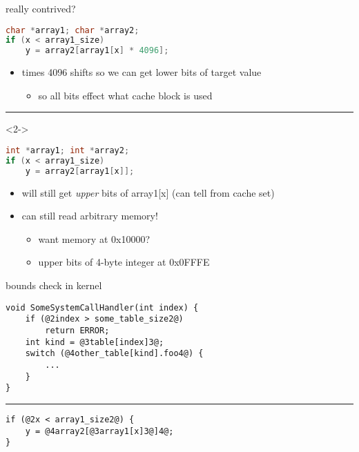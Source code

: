 \begin{frame}[fragile]{really contrived?}
\begin{lstlisting}[language=C,style=smaller]
char *array1; char *array2;
if (x < array1_size)
    y = array2[array1[x] * 4096];
\end{lstlisting}
\begin{itemize}
\item times 4096 shifts so we can get lower bits of target value
    \begin{itemize}
    \item so all bits effect what cache block is used
    \end{itemize}
\end{itemize}
\hrule
\begin{visibleenv}<2->
\begin{lstlisting}[language=C,style=smaller]
int *array1; int *array2;
if (x < array1_size)
    y = array2[array1[x]];
\end{lstlisting}
\begin{itemize}
\item will still get \textit{upper} bits of array1[x] (can tell from cache set)
\item<2-> can still read arbitrary memory!
    \begin{itemize}
    \item want memory at 0x10000?
    \item upper bits of 4-byte integer at 0x0FFFE
    \end{itemize}
\end{itemize}
\end{visibleenv}
\end{frame}

\begin{frame}[fragile]{bounds check in kernel}
\begin{lstlisting}
void SomeSystemCallHandler(int index) {
    if (@2index > some_table_size2@) 
        return ERROR;
    int kind = @3table[index]3@;
    switch (@4other_table[kind].foo4@) {
        ...
    }
}
\end{lstlisting}
\hrule
\begin{lstlisting}
if (@2x < array1_size2@) {
    y = @4array2[@3array1[x]3@]4@;
}
\end{lstlisting}
\end{frame}
